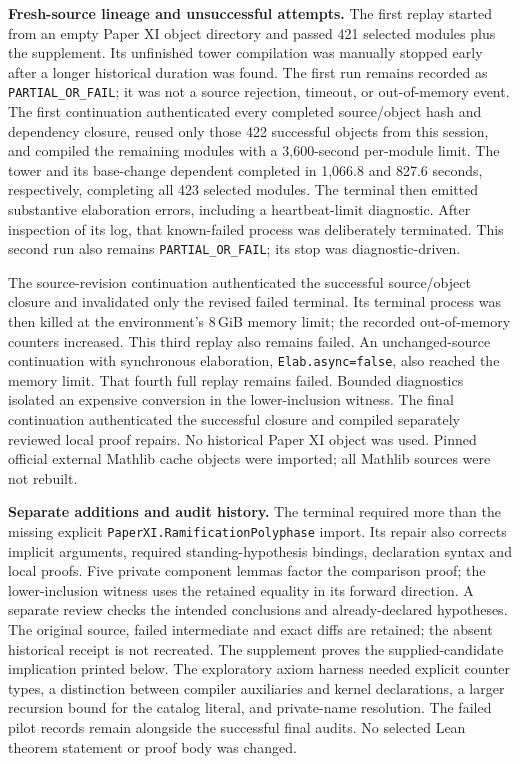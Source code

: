 \textbf{Fresh-source lineage and unsuccessful attempts.}
The first replay started from an empty Paper XI object directory and passed
421 selected modules plus the supplement. Its unfinished tower compilation
was manually stopped early after a longer historical duration was found.
The first run remains recorded as \texttt{PARTIAL\_OR\_FAIL}; it was not a
source rejection, timeout, or out-of-memory event.
The first continuation authenticated every completed source/object hash and
dependency closure, reused only those 422 successful objects from this
session, and compiled the remaining modules with a 3,600-second per-module
limit. The tower and its base-change dependent completed in
1,066.8 and 827.6 seconds, respectively, completing
all 423 selected modules. The terminal then emitted substantive elaboration
errors, including a heartbeat-limit diagnostic. After inspection of its log,
that known-failed process was deliberately terminated. This second run also
remains \texttt{PARTIAL\_OR\_FAIL}; its stop was diagnostic-driven.

The source-revision continuation authenticated the successful source/object
closure and invalidated only the revised failed terminal. Its terminal process
was then killed at the environment's 8\,GiB memory limit; the recorded
out-of-memory counters increased. This third replay also remains failed.
An unchanged-source continuation with synchronous elaboration,
\texttt{Elab.async=false}, also reached the memory limit. That fourth full
replay remains failed. Bounded diagnostics isolated an expensive conversion
in the lower-inclusion witness. The final continuation authenticated the
successful closure and compiled separately reviewed local proof repairs.
No historical Paper XI object was used. Pinned official external Mathlib cache
objects were imported; all Mathlib sources were not rebuilt.

\textbf{Separate additions and audit history.}
The terminal required more than the missing explicit
\nolinkurl{PaperXI.RamificationPolyphase} import. Its repair also corrects
implicit arguments, required standing-hypothesis bindings, declaration syntax
and local proofs. Five private component lemmas factor the comparison proof;
the lower-inclusion witness uses the retained equality in its forward direction.
A separate review checks the intended conclusions and
already-declared hypotheses. The original source, failed intermediate and
exact diffs are retained; the absent historical receipt is not recreated.
The supplement proves the supplied-candidate implication printed below.
The exploratory axiom harness needed explicit counter types, a distinction
between compiler auxiliaries and kernel declarations, a larger recursion
bound for the catalog literal, and private-name resolution. The failed
pilot records remain alongside the successful final audits. No
selected Lean theorem statement or proof body was changed.

